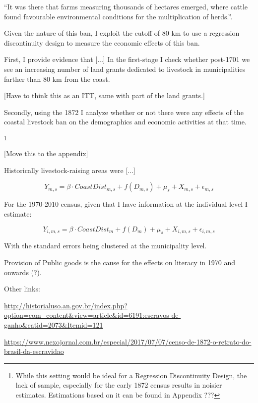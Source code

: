\documentclass{article}
\begin{document}
``It was there that farms measuring thousands of hectares emerged, where cattle found favourable environmental conditions for the multiplication of herds.''\parencite{Ribeiro2012-lb}.


Given the nature of this ban, I exploit the cutoff of 80 km to use a regression discontinuity design to measure the economic effects of this ban. 

First, I provide evidence that [...] In the first-stage I check whether post-1701 we see an increasing number of land grants dedicated to livestock in municipalities farther than 80 km from the coast. 

[Have to think this as an ITT, same with part of the land grants.]

Secondly, using the 1872 I analyze whether or not there were any effects of the coastal livestock ban on the demographics and economic activities at that time.

\footnote{While this setting would be ideal for a Regression Discontinuity Design, the lack of sample, especially for the early 1872 census results in noisier estimates. Estimations based on it can be found in Appendix ???}

[Move this to the appendix]

Historically livestock-raising areas were [...]

\begin{equation}
  Y_{m,s} = \beta \cdot CoastDist_{m,s} + f(D_{m,s})+ \mu_s + X_{m,s} + \epsilon_{m,s}
\end{equation}

For the 1970-2010 census, given that I have information at the individual level I estimate:

\begin{equation}
  Y_{i,m,s} = \beta \cdot CoastDist_{m} + f(D_{m})+ \mu_s + X_{i,m,s} + \epsilon_{i,m,s}
\end{equation}

With the standard errors being clustered at the municipality level. 


Provision of Public goods is the cause for the effects on literacy in 1970 and onwards (?).

Other links:

\url{http://historialuso.an.gov.br/index.php?option=com_content&view=article&id=6191:escravos-de-ganho&catid=2073&Itemid=121}

\url{https://www.nexojornal.com.br/especial/2017/07/07/censo-de-1872-o-retrato-do-brasil-da-escravidao}
\end{document}
